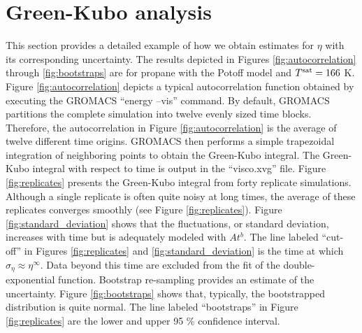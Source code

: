 \documentclass[preprint,review,12pt]{elsarticle}
\begin{document}
%	
%	
	
	
	\section{Green-Kubo analysis} \label{SI:GK_analysis}
	
	This section provides a detailed example of how we obtain estimates for $\eta$ with its corresponding uncertainty. The results depicted in Figures \ref{fig:autocorrelation} through \ref{fig:bootstraps} are for propane with the Potoff model and $T^{\rm sat} = 166$ K. Figure \ref{fig:autocorrelation} depicts a typical autocorrelation function obtained by executing the GROMACS ``energy --vis'' command. By default, GROMACS partitions the complete simulation into twelve evenly sized time blocks. Therefore, the autocorrelation in Figure \ref{fig:autocorrelation} is the average of twelve different time origins. GROMACS then performs a simple trapezoidal integration of neighboring points to obtain the Green-Kubo integral. The Green-Kubo integral with respect to time is output in the ``visco.xvg'' file. Figure \ref{fig:replicates} presents the Green-Kubo integral from forty replicate simulations. Although a single replicate is often quite noisy at long times, the average of these replicates converges smoothly (see Figure \ref{fig:replicates}). Figure \ref{fig:standard_deviation} shows that the fluctuations, or standard deviation, increases with time but is adequately modeled with $A t^{b}$. The line labeled ``cut-off'' in Figures \ref{fig:replicates} and \ref{fig:standard_deviation} is the time at which $\sigma_{\eta} \approx \eta^\infty$. Data beyond this time are excluded from the fit of the double-exponential function. Bootstrap re-sampling provides an estimate of the uncertainty. Figure \ref{fig:bootstraps} shows that, typically, the bootstrapped distribution is quite normal. The line labeled ``bootstraps'' in Figure \ref{fig:replicates} are the lower and upper 95 \% confidence interval.
	
\end{document}
